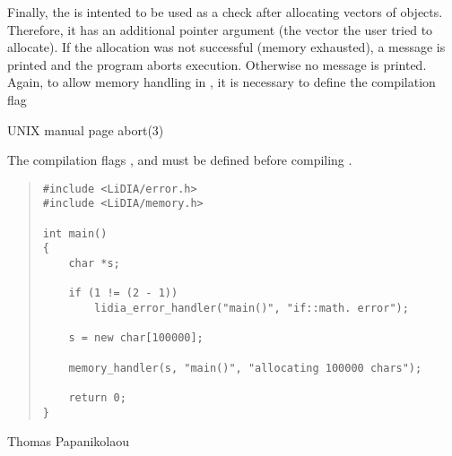 Finally, the  is intented to be used as a check after allocating vectors
of objects.  Therefore, it has an additional pointer argument (the vector the user tried to
allocate).  If the allocation was not successful (memory exhausted), a message is printed and the
program aborts execution.  Otherwise no message is printed.  Again, to allow memory handling in
\LiDIA, it is necessary to define the compilation flag 



\SEEALSO
UNIX manual page abort(3)



\WARNINGS

The compilation flags ,  and  must be
defined before compiling \LiDIA.



\EXAMPLES

\begin{quote}
\begin{verbatim}
#include <LiDIA/error.h>
#include <LiDIA/memory.h>

int main()
{
    char *s;

    if (1 != (2 - 1))
        lidia_error_handler("main()", "if::math. error");

    s = new char[100000];

    memory_handler(s, "main()", "allocating 100000 chars");

    return 0;
}
\end{verbatim}
\end{quote}



\AUTHOR

Thomas Papanikolaou
